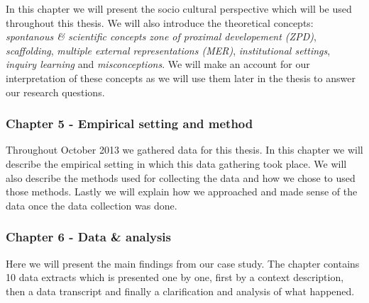 In this chapter we will present the socio cultural perspective which will be used throughout this thesis. We will also introduce the theoretical concepts: \emph{spontanous \& scientific concepts} \emph{zone of proximal developement (ZPD)}, \emph{scaffolding}, \emph{multiple external representations (MER)}, \emph{institutional settings}, \emph{inquiry learning} and \emph{misconceptions}. We will make an account for our interpretation of these concepts as we will use them later in the thesis to answer our research questions. 

\subsubsection*{Chapter 5 - Empirical setting and method}

Throughout October 2013 we gathered data for this thesis. In this chapter we will describe the empirical setting in which this data gathering took place. We will also describe the methods used for collecting the data and how we chose to used those methods. Lastly we will explain how we approached and made sense of the data once the data collection was done. 

\subsubsection*{Chapter 6 - Data \& analysis}
Here we will present the main findings from our case study. The chapter contains 10 data extracts which is presented one by one, first by a context description, then a data transcript and finally a clarification and analysis of what happened. 


